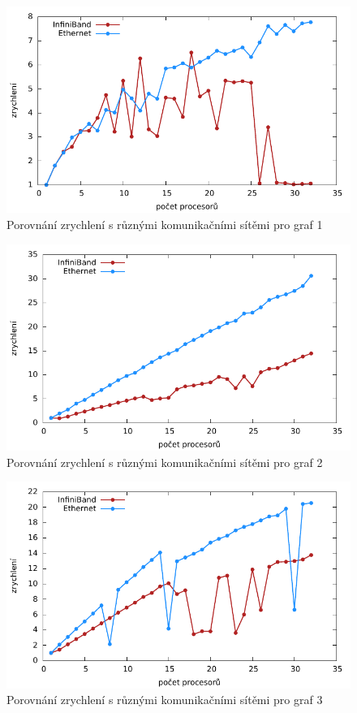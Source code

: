 \documentclass[12pt]{article}
\begin{document}
\begin{figure}
	\caption{Porovnání zrychlení s různými komunikačními sítěmi pro graf 1}
	\includegraphics{graphs/graph1-speedup.pdf}
\end{figure}

\begin{figure}
	\caption{Porovnání zrychlení s různými komunikačními sítěmi pro graf 2}
	\includegraphics{graphs/graph2-speedup.pdf}
\end{figure}

\begin{figure}
	\caption{Porovnání zrychlení s různými komunikačními sítěmi pro graf 3}
	\includegraphics{graphs/graph3-speedup.pdf}
\end{figure}
\end{document}
